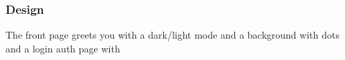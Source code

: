 \subsubsection{Design}
The front page greets you with a dark/light mode and a background with dots and a login auth page with